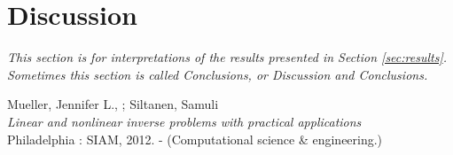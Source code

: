 \documentclass[12pt,a4]{article}
\begin{document}
\section{Discussion}

{\em This section is for interpretations of the results presented in Section \ref{sec:results}. Sometimes this section is called Conclusions, or Discussion and Conclusions.}


\newpage
\begin{thebibliography}{9}

Mueller, Jennifer L., ; Siltanen, Samuli \\
\emph{Linear and nonlinear inverse problems with practical applications} \\ Philadelphia : SIAM, 2012. - (Computational science \& engineering.)

\end{thebibliography}
\end{document}
